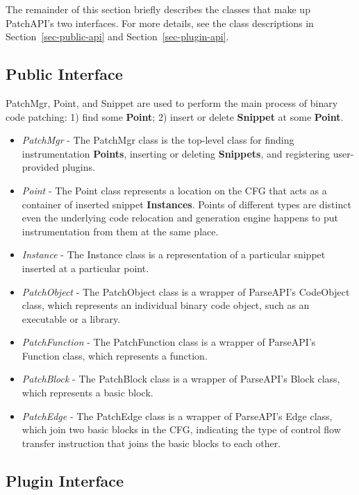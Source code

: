 The remainder of this section briefly describes the classes that make up
PatchAPI's two interfaces. For more details, see the class descriptions in
Section~\ref{sec-public-api} and Section~\ref{sec-plugin-api}.

\subsection{Public Interface}
\label{sec-2.1}

PatchMgr, Point, and Snippet are used to perform the main process of binary code
patching: 1) find some \textbf{Point}; 2) insert or delete \textbf{Snippet} at some \textbf{Point}.
\begin{itemize}
\item \emph{PatchMgr} - The PatchMgr class is the top-level class for finding
    instrumentation \textbf{Points}, inserting or deleting \textbf{Snippets}, and registering
    user-provided plugins.
\item \emph{Point} - The Point class represents a location on the CFG that acts as a
    container of inserted snippet \textbf{Instances}. Points of different types are
    distinct even the underlying code relocation and generation engine happens
    to put instrumentation from them at the same place.
\item \emph{Instance} - The Instance class is a representation of a particular snippet
    inserted at a particular point.
\item \emph{PatchObject} - The PatchObject class is a wrapper of ParseAPI's CodeObject
    class, which represents an individual binary code object, such as an
    executable or a library.
\item \emph{PatchFunction} - The PatchFunction class is a wrapper of ParseAPI's
    Function class, which represents a function.
\item \emph{PatchBlock} - The PatchBlock class is a wrapper of ParseAPI's Block class,
    which represents a basic block.
\item \emph{PatchEdge} - The PatchEdge class is a wrapper of ParseAPI's Edge class,
    which join two basic blocks in the CFG, indicating the type of control flow
    transfer instruction that joins the basic blocks to each other.
\end{itemize}
\subsection{Plugin Interface}
\label{sec-2.2}

